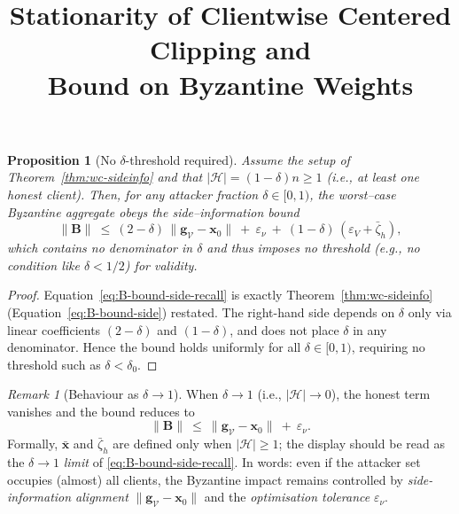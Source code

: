 \documentclass{article}
\title{Stationarity of Clientwise Centered Clipping and\\Bound on Byzantine Weights}
\date{}
\theoremstyle{plain}
\newtheorem{proposition}[theorem]{Proposition}
\theoremstyle{definition}
\theoremstyle{remark}
\newtheorem{remark}[theorem]{Remark}
\begin{document}
\maketitle


\begin{proposition}[No $\delta$-threshold required]\label{prop:no-delta-threshold}
Assume the setup of Theorem~\ref{thm:wc-sideinfo} and that $|\mathcal H|=(1-\delta)n\ge 1$
(i.e., at least one honest client). Then, for \emph{any} attacker fraction
$\delta\in[0,1)$, the worst–case Byzantine aggregate obeys the side–information bound
\begin{equation}\label{eq:B-bound-side-recall}
\|\bm{B}\|
\ \le\
(2-\delta)\,\|\bm{g}_{\mathcal V}-\bm{x}_0\|
\ +\ \varepsilon_\nu
\ +\ (1-\delta)\,(\varepsilon_V+\bar\zeta_h),
\end{equation}
which contains \emph{no denominator in $\delta$} and thus imposes \emph{no threshold}
(e.g., no condition like $\delta<1/2$) for validity.
\end{proposition}

\begin{proof}
Equation~\eqref{eq:B-bound-side-recall} is exactly Theorem~\ref{thm:wc-sideinfo}
(Equation~\eqref{eq:B-bound-side}) restated.
The right-hand side depends on $\delta$ only via linear coefficients $(2-\delta)$ and $(1-\delta)$,
and does not place $\delta$ in any denominator. Hence the bound holds uniformly for all
$\delta\in[0,1)$, requiring no threshold such as $\delta<\delta_0$.
\end{proof}

\begin{remark}[Behaviour as $\delta\to 1$]\label{rem:delta-to-one}
When $\delta\to 1$ (i.e., $|\mathcal H|\to 0$), the honest term vanishes and the bound reduces to
\[
\|\bm{B}\|\ \le\ \|\bm{g}_{\mathcal V}-\bm{x}_0\|\ +\ \varepsilon_\nu.
\]
Formally, $\bar{\bm x}$ and $\bar\zeta_h$ are defined only when $|\mathcal H|\ge1$; the display
should be read as the $\delta\to 1$ \emph{limit} of \eqref{eq:B-bound-side-recall}. In words:
even if the attacker set occupies (almost) all clients, the Byzantine impact remains controlled
by \emph{side-information alignment} $\|\bm{g}_{\mathcal V}-\bm{x}_0\|$ and the
\emph{optimisation tolerance} $\varepsilon_\nu$.
\end{remark}
\end{document}
